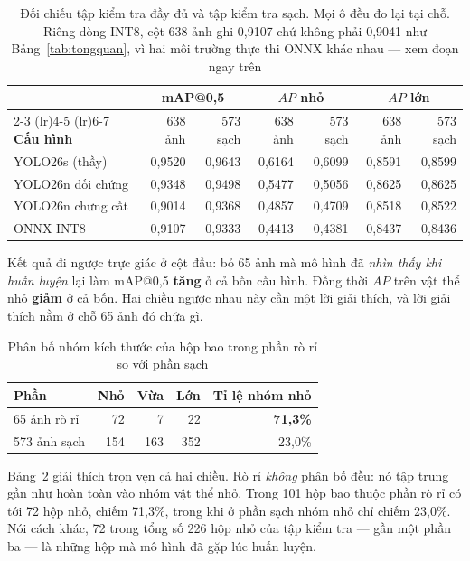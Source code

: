 \begin{table}[H]
\centering
\caption[Đối chiếu tập kiểm tra đầy đủ và tập kiểm tra sạch]{Đối chiếu tập kiểm tra đầy đủ và tập
kiểm tra sạch. Mọi ô đều đo lại tại chỗ. Riêng dòng INT8, cột 638 ảnh ghi 0,9107 chứ không phải
0,9041 như Bảng~\ref{tab:tongquan}, vì hai môi trường thực thi ONNX khác nhau --- xem đoạn ngay
trên}
\label{tab:tapsach}
\footnotesize
\begin{tabular}{lrrrrrr}
\toprule
& \multicolumn{2}{c}{\textbf{mAP@0,5}} & \multicolumn{2}{c}{\textbf{$AP$ nhỏ}} & \multicolumn{2}{c}{\textbf{$AP$ lớn}} \\
\cmidrule(lr){2-3} \cmidrule(lr){4-5} \cmidrule(lr){6-7}
\textbf{Cấu hình} & 638 ảnh & 573 sạch & 638 ảnh & 573 sạch & 638 ảnh & 573 sạch \\
\midrule
YOLO26s (thầy)    & 0,9520 & 0,9643 & 0,6164 & 0,6099 & 0,8591 & 0,8599 \\
YOLO26n đối chứng & 0,9348 & 0,9498 & 0,5477 & 0,5056 & 0,8625 & 0,8625 \\
YOLO26n chưng cất & 0,9014 & 0,9368 & 0,4857 & 0,4709 & 0,8518 & 0,8522 \\
ONNX INT8         & 0,9107 & 0,9333 & 0,4413 & 0,4381 & 0,8437 & 0,8436 \\
\bottomrule
\end{tabular}
\end{table}

Kết quả đi ngược trực giác ở cột đầu: bỏ 65 ảnh mà mô hình đã \emph{nhìn thấy khi huấn luyện} lại
làm mAP@0,5 \textbf{tăng} ở cả bốn cấu hình. Đồng thời $AP$ trên vật thể nhỏ \textbf{giảm} ở cả bốn.
Hai chiều ngược nhau này cần một lời giải thích, và lời giải thích nằm ở chỗ 65 ảnh đó chứa gì.

\begin{table}[H]
\centering
\caption{Phân bố nhóm kích thước của hộp bao trong phần rò rỉ so với phần sạch}
\label{tab:rori_kichthuoc}
\small
\begin{tabular}{lrrrr}
\toprule
\textbf{Phần} & \textbf{Nhỏ} & \textbf{Vừa} & \textbf{Lớn} & \textbf{Tỉ lệ nhóm nhỏ} \\
\midrule
65 ảnh rò rỉ & 72  & 7   & 22  & \textbf{71,3\%} \\
573 ảnh sạch & 154 & 163 & 352 & 23,0\% \\
\bottomrule
\end{tabular}
\end{table}

Bảng~\ref{tab:rori_kichthuoc} giải thích trọn vẹn cả hai chiều. Rò rỉ \emph{không} phân bố đều: nó
tập trung gần như hoàn toàn vào nhóm vật thể nhỏ. Trong 101 hộp bao thuộc phần rò rỉ có tới 72 hộp
nhỏ, chiếm 71,3\%, trong khi ở phần sạch nhóm nhỏ chỉ chiếm 23,0\%. Nói cách khác, 72 trong tổng số
226 hộp nhỏ của tập kiểm tra --- gần một phần ba --- là những hộp mà mô hình đã gặp lúc huấn luyện.

